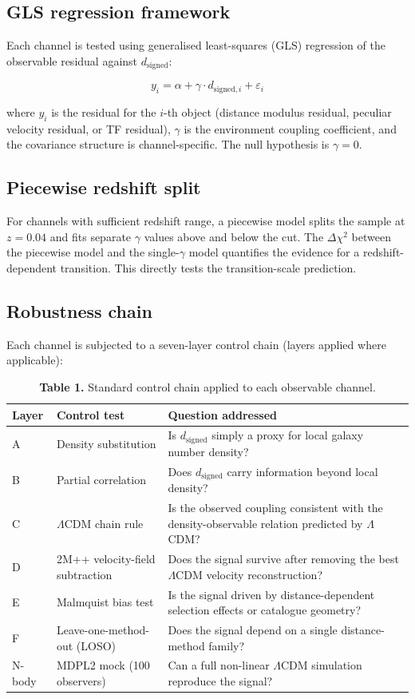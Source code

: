 \documentclass[11pt,a4paper]{article}
\begin{document}
\subsection{GLS regression framework}
Each channel is tested using generalised least-squares (GLS) regression of the observable residual against \(d_\mathrm{signed}\):

\[
y_i = \alpha + \gamma \cdot d_{\mathrm{signed},i} + \varepsilon_i
\]

where \(y_i\) is the residual for the \(i\)-th object (distance modulus residual, peculiar velocity residual, or TF residual), \(\gamma\) is the environment coupling coefficient, and the covariance structure is channel-specific. The null hypothesis is \(\gamma = 0\).

\subsection{Piecewise redshift split}
For channels with sufficient redshift range, a piecewise model splits the sample at \(z = 0.04\) and fits separate \(\gamma\) values above and below the cut. The \(\Delta\chi^2\) between the piecewise model and the single-\(\gamma\) model quantifies the evidence for a redshift-dependent transition. This directly tests the transition-scale prediction.

\subsection{Robustness chain}
Each channel is subjected to a seven-layer control chain (layers applied where applicable):

\begin{table}[H]
\centering
\footnotesize
\caption{\textbf{Table 1.} Standard control chain applied to each observable channel.}
\begin{tabularx}{\linewidth}{l>{\RaggedRight\arraybackslash}X>{\RaggedRight\arraybackslash}X}
\toprule
\textbf{Layer} & \textbf{Control test} & \textbf{Question addressed} \tabularnewline
\midrule
A & Density substitution & Is \(d_\mathrm{signed}\) simply a proxy for local galaxy number density? \tabularnewline
B & Partial correlation & Does \(d_\mathrm{signed}\) carry information beyond local density? \tabularnewline
C & \(\Lambda\)CDM chain rule & Is the observed coupling consistent with the density-observable relation predicted by \(\Lambda\)CDM? \tabularnewline
D & 2M++ velocity-field subtraction & Does the signal survive after removing the best \(\Lambda\)CDM velocity reconstruction? \tabularnewline
E & Malmquist bias test & Is the signal driven by distance-dependent selection effects or catalogue geometry? \tabularnewline
F & Leave-one-method-out (LOSO) & Does the signal depend on a single distance-method family? \tabularnewline
N-body & MDPL2 mock (100 observers) & Can a full non-linear \(\Lambda\)CDM simulation reproduce the signal? \tabularnewline
\bottomrule
\end{tabularx}
\end{table}
\end{document}
